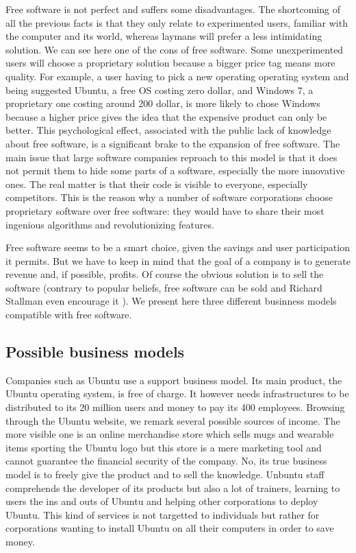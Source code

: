\documentclass[12pt]{article}
\begin{document}
Free software is not perfect and suffers some disadvantages. The
shortcoming of all the previous facts is that they only relate to
experimented users, familiar with the computer and its world, whereas
laymans will prefer a less intimidating solution. We can see here one
of the cons of free software. Some unexperimented users will choose a
proprietary solution because a bigger price tag means more quality.
For example, a user having to pick a new operating operating system
and being suggested Ubuntu, a free OS costing zero dollar, and Windows
7, a proprietary one costing around 200 dollar, is more likely to
chose Windows because a higher price gives the idea that the expensive
product can only be better.  This psychological effect, associated
with the public lack of knowledge about free software, is a
significant brake to the expansion of free software. The main issue
that large software companies reproach to this model is that it does
not permit them to hide some parts of a software, especially the more
innovative ones. The real matter is that their code is visible to
everyone, especially competitors. This is the reason why a number of
software corporations choose proprietary software over free software:
they would have to share their most ingenious algorithms and
revolutionizing features.

Free software seems to be a smart choice, given the savings and user
participation it permits. But we have to keep in mind that the goal of
a company is to generate revenue and, if possible, profits. Of course
the obvious solution is to sell the software (contrary to popular
beliefs, free software can be sold and Richard Stallman even encourage
it \cite{sell}). We present here three different businness models
compatible with free software.

\subsection{Possible business models}

Companies such as Ubuntu use a support business model. Its main
product, the Ubuntu operating system, is free of charge. It however
needs infrastructures to be distributed to its 20 million users and
money to pay its 400 employees. Browsing through the Ubuntu website,
we remark several possible sources of income. The more visible one is
an online merchandise store which sells mugs and wearable items
sporting the Ubuntu logo but this store is a mere marketing tool and
cannot guarantee the financial security of the company.  No, its true
business model is to freely give the product and to sell the
knowledge. Unbuntu staff comprehends the developer of its products but
also a lot of trainers, learning to users the ins and outs of Ubuntu
and helping other corporations to deploy Ubuntu. This kind of services
is not targetted to individuals but rather for corporations wanting to
install Ubuntu on all their computers in order to save money.
\end{document}
